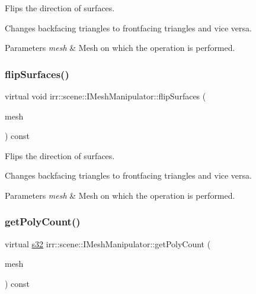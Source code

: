 Flips the direction of surfaces. 

Changes backfacing triangles to frontfacing triangles and vice versa. 
\begin{DoxyParams}{Parameters}
{\em mesh} & Mesh on which the operation is performed. \\
\hline
\end{DoxyParams}
\mbox{\label{classirr_1_1scene_1_1IMeshManipulator_a7194e8a44bfe3a6444826f346c4104ff}} 
\subsubsection{\texorpdfstring{flip\+Surfaces()}{flipSurfaces()}\hspace{0.1cm}{\footnotesize\ttfamily [2/2]}}
{\footnotesize\ttfamily virtual void irr\+::scene\+::\+I\+Mesh\+Manipulator\+::flip\+Surfaces (\begin{DoxyParamCaption}\item[{\hyperlink{classirr_1_1scene_1_1IMesh}{I\+Mesh} $\ast$}]{mesh }\end{DoxyParamCaption}) const\hspace{0.3cm}{\ttfamily [pure virtual]}}



Flips the direction of surfaces. 

Changes backfacing triangles to frontfacing triangles and vice versa. 
\begin{DoxyParams}{Parameters}
{\em mesh} & Mesh on which the operation is performed. \\
\hline
\end{DoxyParams}
\mbox{\label{classirr_1_1scene_1_1IMeshManipulator_a914c8cbfbde1428dea91b34fe99e716d}} 
\subsubsection{\texorpdfstring{get\+Poly\+Count()}{getPolyCount()}\hspace{0.1cm}{\footnotesize\ttfamily [1/4]}}
{\footnotesize\ttfamily virtual \hyperlink{namespaceirr_ac66849b7a6ed16e30ebede579f9b47c6}{s32} irr\+::scene\+::\+I\+Mesh\+Manipulator\+::get\+Poly\+Count (\begin{DoxyParamCaption}\item[{\hyperlink{classirr_1_1scene_1_1IMesh}{I\+Mesh} $\ast$}]{mesh }\end{DoxyParamCaption}) const\hspace{0.3cm}{\ttfamily [pure virtual]}}



